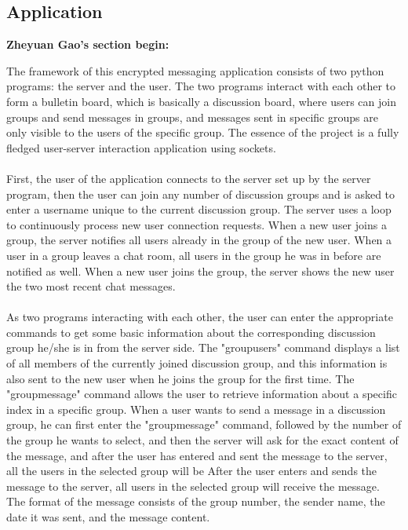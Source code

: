 \documentclass[12pt, border = 4pt, multi]{article} %
\begin{document}
\subsection*{Application}
\textbf{Zheyuan Gao's section begin:}
\begin{multicols}{2}
\noindent 
The framework of this encrypted messaging application consists of two python programs: the server and the user. The two programs interact with each other to form a bulletin board, which is basically a discussion board, where users can join groups and send messages in groups, and messages sent in specific groups are only visible to the users of the specific group. The essence of the project is a fully fledged user-server interaction application using sockets. \\
\\
First, the user of the application connects to the server set up by the server program, then the user can join any number of discussion groups and is asked to enter a username unique to the current discussion group. The server uses a loop to continuously process new user connection requests. When a new user joins a group, the server notifies all users already in the group of the new user. When a user in a group leaves a chat room, all users in the group he was in before are notified as well. When a new user joins the group, the server shows the new user the two most recent chat messages.\\
\\
As two programs interacting with each other, the user can enter the appropriate commands to get some basic information about the corresponding discussion group he/she is in from the server side. The "groupusers" command displays a list of all members of the currently joined discussion group, and this information is also sent to the new user when he joins the group for the first time. The "groupmessage" command allows the user to retrieve information about a specific index in a specific group. When a user wants to send a message in a discussion group, he can first enter the "groupmessage" command, followed by the number of the group he wants to select, and then the server will ask for the exact content of the message, and after the user has entered and sent the message to the server, all the users in the selected group will be After the user enters and sends the message to the server, all users in the selected group will receive the message. The format of the message consists of the group number, the sender name, the date it was sent, and the message content.\\

\end{multicols}
\end{document}
